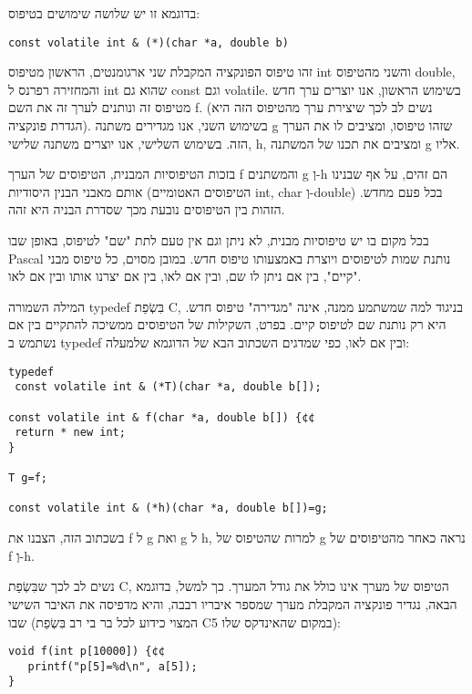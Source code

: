 \begin{טבלא}[!htbp]
      בדוגמא זו יש שלושה שימושים בטיפוס:

\begin{verbatim}
const volatile int & (*)(char *a, double b)
\end{verbatim}

      זהו טיפוס הפונקציה המקבלת שני ארגומנטים, הראשון מטיפוס int והשני מהטיפוס double, והמחזירה רפרנס ל int שהוא גם const וגם volatile. בשימוש הראשון, אנו יוצרים ערך חדש מטיפוס זה ונותנים לערך זה את השם f. (נשים לב לכך שיצירת ערך מהטיפוס הזה היא הגדרת פונקציה). בשימוש השני, אנו מגדירים משתנה g שזהו טיפוסו, ומציבים לו את הערך הזה. בשימוש השלישי, אנו יוצרים משתנה שלישי, h, ומציבים את תכנו של המשתנה g אליו.

      בזכות הטיפוסיות המבנית, הטיפוסים של הערך f והמשתנים g וְ-h הם זהים, על אף שבנינו אותם מאבני הבנין היסודיות (הטיפוסים האטומיים int, char וְ-double) בכל פעם מחדש. הזהות בין הטיפוסים נובעת מכך שסדרת הבניה היא זהה.

      בכל מקום בו יש טיפוסיות מבנית, לא ניתן וגם אין טעם לתת "שם" לטיפוס, באופן שבו Pascal נותנת שמות לטיפוסים ויוצרת באמצעותו טיפוס חדש. במובן מסוים, כל טיפוס מבני "קיים", בין אם ניתן לו שם, ובין אם לאו, בין אם יצרנו אותו ובין אם לאו.

      המילה השמורה typedef בִּשְׂפַת C, בניגוד למה שמשתמע ממנה, אינה "מגדירה" טיפוס חדש. היא רק נותנת שם לטיפוס קיים. בפרט, השקילות של הטיפוסים ממשיכה להתקיים בין אם נשתמש ב typedef ובין אם לאו, כפי שמדגים השכתוב הבא של הדוגמא שלמעלה:

\begin{verbatim}
typedef
 const volatile int & (*T)(char *a, double b[]);

const volatile int & f(char *a, double b[]) {¢¢
 return * new int;
}

T g=f;

const volatile int & (*h)(char *a, double b[])=g;
\end{verbatim}

      בשכתוב הזה, הצבנו את f ל g ואת g ל h, למרות שהטיפוס של g נראה כאחר מהטיפוסים של f וְ-h.

      נשים לב לכך שבִּשְׂפַת C, הטיפוס של מערך אינו כולל את גודל המערך. כך למשל, בדוגמא הבאה, נגדיר פונקציה המקבלת מערך שמספר איבריו רבבה, והיא מדפיסה את האיבר השישי שבו (המצוי כידוע לכל בר בי רב בִּשְׂפַת Cבמקום שהאינדקס שלו 5):

\begin{verbatim}
void f(int p[10000]) {¢¢
   printf("p[5]=%d\n", a[5]);
}
\end{verbatim}


\end{טבלא}
